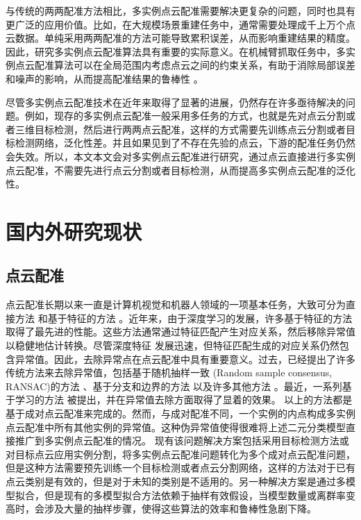 与传统的两两配准方法相比，多实例点云配准需要解决更复杂的问题，同时也具有更广泛的应用价值。比如，在大规模场景重建任务中，通常需要处理成千上万个点云数据。单纯采用两两配准的方法可能导致累积误差，从而影响重建结果的精度。因此，研究多实例点云配准算法具有重要的实际意义。在机械臂抓取任务中，多实例点云配准算法可以在全局范围内考虑点云之间的约束关系，有助于消除局部误差和噪声的影响，从而提高配准结果的鲁棒性 \cite{stuckler2012robust} 。

尽管多实例点云配准技术在近年来取得了显著的进展，仍然存在许多亟待解决的问题。例如，现存的多实例点云配准一般采用多任务的方式，也就是先对点云分割或者三维目标检测，然后进行两两点云配准，这样的方式需要先训练点云分割或者目标检测网络，泛化性差。并且如果见到了不存在先验的点云，下游的配准任务仍然会失效。所以，本文本文会对多实例点云配准进行研究，通过点云直接进行多实例点云配准，不需要先进行点云分割或者目标检测，从而提高多实例点云配准的泛化性。


\section{国内外研究现状}

\subsection{点云配准}
点云配准长期以来一直是计算机视觉和机器人领域的一项基本任务，大致可分为直接方法 \cite{besl1992method, pomerleau2015review} 和基于特征的方法 \cite{qi2017pointnet,huang2021predator,bai2021pointdsc} 。近年来，由于深度学习的发展，许多基于特征的方法取得了最先进的性能。这些方法通常通过特征匹配产生对应关系，然后移除异常值以稳健地估计转换。尽管深度特征 \cite{qi2017pointnet,huang2021predator,bai2021pointdsc, wang2022you} 发展迅速，但特征匹配生成的对应关系仍然包含异常值。因此，去除异常点在点云配准中具有重要意义。过去，已经提出了许多传统方法来去除异常值，包括基于随机抽样一致 (Random sample consensus, RANSAC)的方法 \cite{barath2021progressive,zhao2021progressive,barath2018graph} 、基于分支和边界的方法 \cite{kluger2020consac} 以及许多其他方法 \cite{huang2021predator,yang2020teaser} 。最近，一系列基于学习的方法 \cite{bai2020d3feat,yi2018learning} 被提出，并在异常值去除方面取得了显着的效果。
以上的方法都是基于成对点云配准来完成的。然而，与成对配准不同，一个实例的内点构成多实例点云配准中所有其他实例的异常值。这种伪异常值使得很难将上述二元分类模型直接推广到多实例点云配准的情况。
现有该问题解决方案包括采用目标检测方法或对目标点云应用实例分割，将多实例点云配准问题转化为多个成对点云配准问题，但是这种方法需要预先训练一个目标检测或者点云分割网络，这样的方法对于已有点云类别是有效的，但是对于未知的类别是不适用的。另一种解决方案是通过多模型拟合，但是现有的多模型拟合方法依赖于抽样有效假设，当模型数量或离群率变高时，会涉及大量的抽样步骤，使得这些算法的效率和鲁棒性急剧下降。

